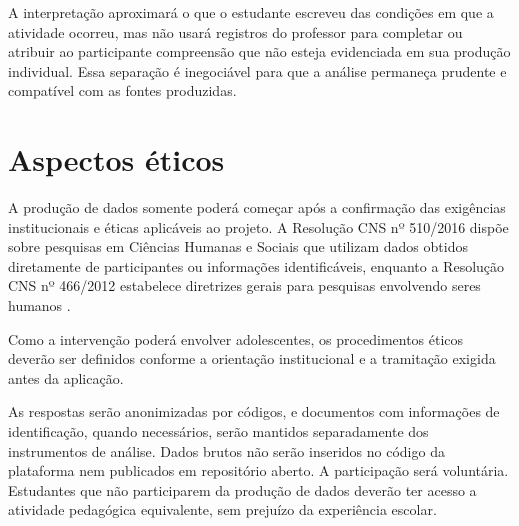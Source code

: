A interpretação aproximará o que o estudante escreveu das condições em que a atividade ocorreu, mas não usará registros do professor para completar ou atribuir ao participante compreensão que não esteja evidenciada em sua produção individual. Essa separação é inegociável para que a análise permaneça prudente e compatível com as fontes produzidas.

\section{Aspectos éticos}

A produção de dados somente poderá começar após a confirmação das exigências institucionais e éticas aplicáveis ao projeto. A Resolução CNS nº 510/2016 dispõe sobre pesquisas em Ciências Humanas e Sociais que utilizam dados obtidos diretamente de participantes ou informações identificáveis, enquanto a Resolução CNS nº 466/2012 estabelece diretrizes gerais para pesquisas envolvendo seres humanos \cite{brasil2016cns510,brasil2012cns466}.

Como a intervenção poderá envolver adolescentes, os procedimentos éticos deverão ser definidos conforme a orientação institucional e a tramitação exigida antes da aplicação.

As respostas serão anonimizadas por códigos, e documentos com informações de identificação, quando necessários, serão mantidos separadamente dos instrumentos de análise. Dados brutos não serão inseridos no código da plataforma nem publicados em repositório aberto. A participação será voluntária. Estudantes que não participarem da produção de dados deverão ter acesso a atividade pedagógica equivalente, sem prejuízo da experiência escolar.
